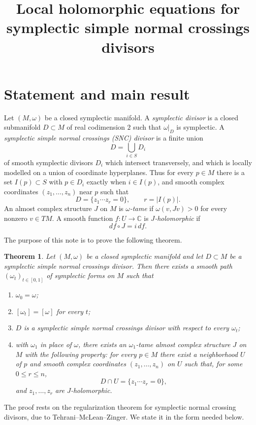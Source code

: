 \documentclass[11pt]{article}
\title{Local holomorphic equations for symplectic simple normal crossings divisors}
\author{}
\date{}
\newtheorem{theorem}{Theorem}[section]
\begin{document}
\maketitle

\section{Statement and main result}

Let $(M,\omega)$ be a closed symplectic manifold. A \emph{symplectic divisor} is a closed submanifold $D\subset M$ of real codimension $2$ such that $\omega|_D$ is symplectic. A \emph{symplectic simple normal crossings (SNC) divisor} is a finite union
\[
D=\bigcup_{i\in S}D_i
\]
of smooth symplectic divisors $D_i$ which intersect transversely, and which is locally modelled on a union of coordinate hyperplanes. Thus for every $p\in M$ there is a set $I(p)\subset S$ with $p\in D_i$ exactly when $i\in I(p)$, and smooth complex coordinates $(z_1,\dots,z_n)$ near $p$ such that
\[
D=\{z_1\cdots z_r=0\},\qquad r=|I(p)|.
\]
An almost complex structure $J$ on $M$ is \emph{$\omega$-tame} if $\omega(v,Jv)>0$ for every nonzero $v\in TM$. A smooth function $f:U\to\mathbb C$ is \emph{$J$-holomorphic} if
\[
df\circ J=i\,df.
\]

The purpose of this note is to prove the following theorem.

\begin{theorem}\label{thm:main}
Let $(M,\omega)$ be a closed symplectic manifold and let $D\subset M$ be a symplectic simple normal crossings divisor. Then there exists a smooth path $(\omega_t)_{t\in[0,1]}$ of symplectic forms on $M$ such that
\begin{enumerate}
\item $\omega_0=\omega$;
\item $[\omega_t]=[\omega]$ for every $t$;
\item $D$ is a symplectic simple normal crossings divisor with respect to every $\omega_t$;
\item with $\omega_1$ in place of $\omega$, there exists an $\omega_1$-tame almost complex structure $J$ on $M$ with the following property: for every $p\in M$ there exist a neighborhood $U$ of $p$ and smooth complex coordinates $(z_1,\dots,z_n)$ on $U$ such that, for some $0\le r\le n$,
\[
D\cap U=\{z_1\cdots z_r=0\},
\]
and $z_1,\dots,z_r$ are $J$-holomorphic.
\end{enumerate}
\end{theorem}

The proof rests on the regularization theorem for symplectic normal crossing divisors, due to Tehrani--McLean--Zinger. We state it in the form needed below.
\end{document}
